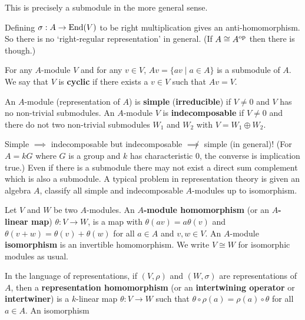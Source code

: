 \begin{rmk}
	This is precisely a submodule in the more general sense.
\end{rmk}

\begin{rmk}
	Defining $\sigma:A \to \operatorname{End}(V)$ to be right multiplication gives an anti-homomorphism.
	So there is no `right-regular representation' in general.
	(If $A \cong A^{\operatorname{op}}$ then there is though.)
\end{rmk}

\begin{defn}
	For any $A$-module $V$ and for any $v \in V$, $Av = \{av \mid a \in A\}$ is a submodule of $A$.
	We say that $V$ is \textbf{cyclic} if there exists a $v \in V$ such that $Av=V$.
\end{defn}

\begin{defn}
	An $A$-module (representation of $A$) is \textbf{simple} (\textbf{irreducible}) if $V \neq 0$ and $V$ has no non-trivial submodules.
	An $A$-module $V$ is \textbf{indecomposable} if $V \neq 0$ and there do not two non-trivial submodules $W_1$ and $W_2$ with $V = W_1 \oplus W_2$.
\end{defn}

\begin{rmk}
	Simple $\implies$ indecomposable but indecomposable $\not\implies$ simple (in general)!
	(For $A=kG$ where $G$ is a group and $k$ has characteristic $0$, the converse is implication true.)
	Even if there is a submodule there may not exist a direct sum complement which is also a submodule.
	A typical problem in representation theory is given an algebra $A$, classify all simple and indecomposable $A$-modules up to isomorphism.
\end{rmk}

\begin{defn}
	Let $V$ and $W$ be two $A$-modules.
	An \textbf{$A$-module homomorphism} (or an \textbf{$A$-linear map}) $\theta:V \to W$, is a map with \@ $\theta(av)=a\theta(v)$ and $\theta(v+w)=\theta(v)+\theta(w)$ for all $a \in A$ and $v,w \in V$.
	An $A$-module \textbf{isomorphism} is an invertible homomorphism.
	We write $V \cong W$ for isomorphic modules as usual.
	
	In the language of representations, if $(V,\rho)$ and $(W,\sigma)$ are representations of $A$, then a \textbf{representation homomorphism} (or an \textbf{intertwining operator} or \textbf{intertwiner}) is a $k$-linear map $\theta: V \to W$ such that $\theta \circ \rho(a) = \rho(a) \circ \theta$ for all $a \in A$.
	An isomorphism
\end{defn}

